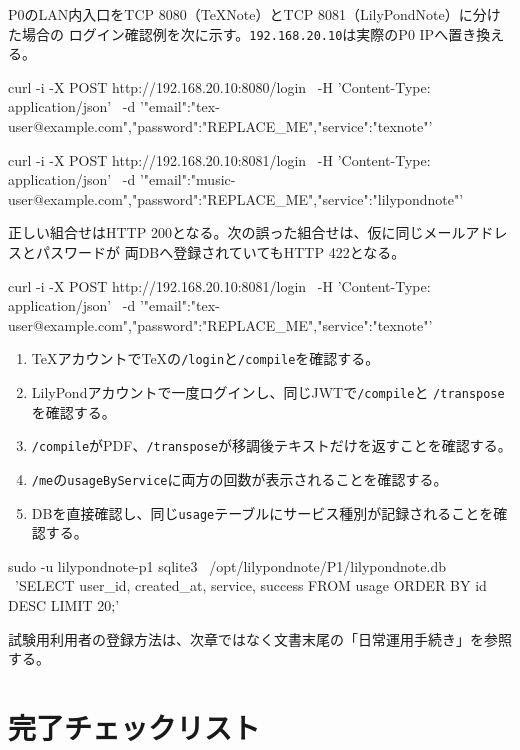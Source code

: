 \documentclass[uplatex,a4paper,11pt]{jsarticle}
\begin{document}
P0のLAN内入口をTCP 8080（TeXNote）とTCP 8081（LilyPondNote）に分けた場合の
ログイン確認例を次に示す。\texttt{192.168.20.10}は実際のP0 IPへ置き換える。

\begin{command}
curl -i -X POST http://192.168.20.10:8080/login \
  -H 'Content-Type: application/json' \
  -d '{"email":"tex-user@example.com","password":"REPLACE_ME","service":"texnote"}'

curl -i -X POST http://192.168.20.10:8081/login \
  -H 'Content-Type: application/json' \
  -d '{"email":"music-user@example.com","password":"REPLACE_ME","service":"lilypondnote"}'
\end{command}

正しい組合せはHTTP 200となる。次の誤った組合せは、仮に同じメールアドレスとパスワードが
両DBへ登録されていてもHTTP 422となる。

\begin{command}
curl -i -X POST http://192.168.20.10:8081/login \
  -H 'Content-Type: application/json' \
  -d '{"email":"tex-user@example.com","password":"REPLACE_ME","service":"texnote"}'
\end{command}

\begin{enumerate}
  \item TeXアカウントでTeXの\texttt{/login}と\texttt{/compile}を確認する。
  \item LilyPondアカウントで一度ログインし、同じJWTで\texttt{/compile}と
        \texttt{/transpose}を確認する。
  \item \texttt{/compile}がPDF、\texttt{/transpose}が移調後テキストだけを返すことを確認する。
  \item \texttt{/me}の\texttt{usageByService}に両方の回数が表示されることを確認する。
  \item DBを直接確認し、同じ\texttt{usage}テーブルにサービス種別が記録されることを確認する。
\end{enumerate}

\begin{command}
sudo -u lilypondnote-p1 sqlite3 \
  /opt/lilypondnote/P1/lilypondnote.db \
  'SELECT user_id, created_at, service, success FROM usage ORDER BY id DESC LIMIT 20;'
\end{command}

試験用利用者の登録方法は、次章ではなく文書末尾の「日常運用手続き」を参照する。

\section{完了チェックリスト}
\end{document}
